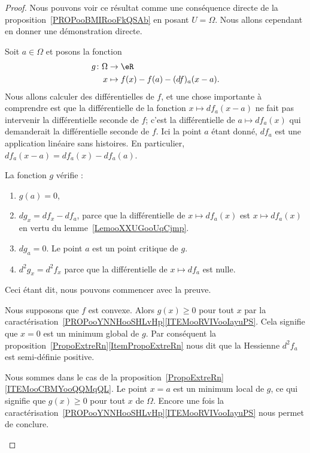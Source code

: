 \begin{proof}
	Nous pouvons voir ce résultat comme une conséquence directe de la proposition~\ref{PROPooBMIRooFkQSAb} en posant \( U=\Omega\). Nous allons cependant en donner une démonstration directe.

	Soit \( a\in \Omega\) et posons la fonction
	\begin{equation}
		\begin{aligned}
			g\colon \Omega & \to \eR                        \\
			x              & \mapsto f(x)-f(a)-(df)_a(x-a).
		\end{aligned}
	\end{equation}
	Nous allons calculer des différentielles de \( f\), et une chose importante à comprendre est que la différentielle de la fonction \( x\mapsto df_a(x-a)\) ne fait pas intervenir la différentielle seconde de \( f\); c'est la différentielle de \( a\mapsto df_a(x)\) qui demanderait la différentielle seconde de \( f\). Ici la point \( a\) étant donné, \( df_a\) est une application linéaire sans histoires. En particulier, \( df_a(x-a)=df_a(x)-df_a(a)\).

	La fonction \( g\) vérifie :
	\begin{enumerate}
		\item
		      \( g(a)=0\),
		\item
		      \( dg_x=df_x-df_a\), parce que la différentielle de \( x\mapsto df_a(x)\) est \( x\mapsto df_a(x)\) en vertu du lemme~\ref{LemooXXUGooUqCjmp}.
		\item
		      \( dg_a=0\). Le point \( a\) est un point critique de \( g\).
		\item
		      \( d^2g_x=d^2f_x\) parce que la différentielle de \( x\mapsto df_a\) est nulle.
	\end{enumerate}
	Ceci étant dit, nous pouvons commencer avec la preuve.
	\begin{subproof}

		Nous supposons que \( f\) est convexe. Alors \( g(x)\geq 0\) pour tout \( x\) par la caractérisation~\ref{PROPooYNNHooSHLvHp}\ref{ITEMooRVIVooIayuPS}. Cela signifie que \( x=0\) est un minimum global de \( g\). Par conséquent la proposition~\ref{PropoExtreRn}\ref{ItemPropoExtreRn} nous dit que la Hessienne \( d^2f_a\) est semi-définie positive.


		Nous sommes dans le cas de la proposition~\ref{PropoExtreRn}\ref{ITEMooCBMYooQQMqQL}. Le point \( x=a\) est un minimum local de \( g\), ce qui signifie que \( g(x)\geq 0\) pour tout \( x\) de \( \Omega\). Encore une fois la caractérisation~\ref{PROPooYNNHooSHLvHp}\ref{ITEMooRVIVooIayuPS} nous permet de conclure.


\end{subproof}
\end{proof}
